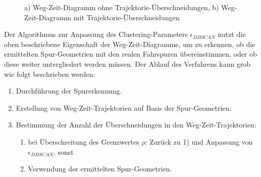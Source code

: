 \begin{figure}[H]
    \centering
    \qquad
    \caption[Weg-Zeit-Diagramme mit und ohne Trajektorie-Schnittpunkten]
            {a) Weg-Zeit-Diagramm ohne Trajektorie-Überschneidungen, b) Weg-Zeit-Diagramm mit Trajektorie-Überschneidungen}
    \label{fig:real1_way_time_diagramms}
\end{figure}

Der Algorithmus zur Anpassung des Clustering-Parameters $\epsilon_{DBSCAN}$ nutzt die oben beschriebene
Eigenschaft der Weg-Zeit-Diagramme, um zu erkennen, ob die ermittelten Spur-Geometrien mit den realen
Fahrspuren übereinstimmen, oder ob diese weiter untergliedert werden müssen.
Der Ablauf des Verfahrens kann grob wie folgt beschrieben werden:

\begin{enumerate}
    \item Durchführung der Spurerkennung.
    \item Erstellung von Weg-Zeit-Trajektorien auf Basis der Spur-Geometrien.
    \item Bestimmung der Anzahl der Überschneidungen in den Weg-Zeit-Trajektorien:
    \begin{enumerate}
        \item bei Überschreitung des Grenzwertes $\rho$: Zurück zu 1) und Anpassung von\\ $\epsilon_{DBSCAN}$, sonst
        \item Verwendung der ermittelten Spur-Geometrien.
    \end{enumerate}
\end{enumerate}

